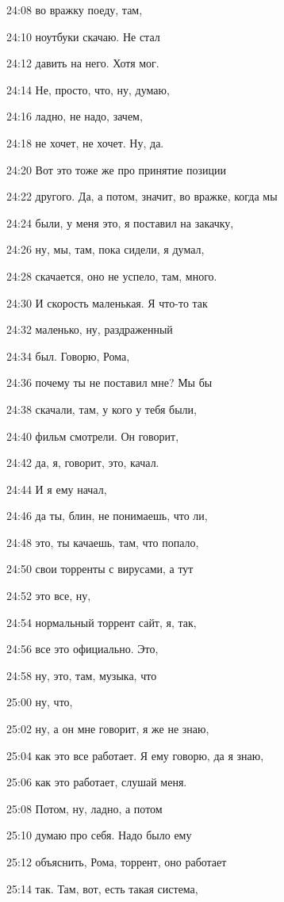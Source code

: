 24:08
во вражку поеду, там,

24:10
ноутбуки скачаю. Не стал

24:12
давить на него. Хотя мог.

24:14
Не, просто, что, ну, думаю,

24:16
ладно, не надо, зачем,

24:18
не хочет, не хочет. Ну, да.

24:20
Вот это тоже же про принятие позиции

24:22
другого. Да, а потом, значит, во вражке, когда мы

24:24
были, у меня это, я поставил на закачку,

24:26
ну, мы, там, пока сидели, я думал,

24:28
скачается, оно не успело, там, много.

24:30
И скорость маленькая. Я что-то так

24:32
маленько, ну, раздраженный

24:34
был. Говорю, Рома,

24:36
почему ты не поставил мне? Мы бы

24:38
скачали, там, у кого у тебя были,

24:40
фильм смотрели. Он говорит,

24:42
да, я, говорит, это, качал.

24:44
И я ему начал,

24:46
да ты, блин, не понимаешь, что ли,

24:48
это, ты качаешь, там, что попало,

24:50
свои торренты с вирусами, а тут

24:52
это все, ну,

24:54
нормальный торрент сайт, я, так,

24:56
все это официально. Это,

24:58
ну, это, там, музыка, что

25:00
ну, что,

25:02
ну, а он мне говорит, я же не знаю,

25:04
как это все работает. Я ему говорю, да я знаю,

25:06
как это работает, слушай меня.

25:08
Потом, ну, ладно, а потом

25:10
думаю про себя. Надо было ему

25:12
объяснить, Рома, торрент, оно работает

25:14
так. Там, вот, есть такая система,

